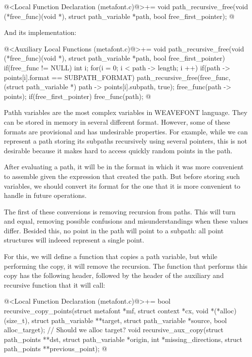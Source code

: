 \iniciocodigo
@<Local Function Declaration (metafont.c)@>+=
void path_recursive_free(void (*free_func)(void *),
                         struct path_variable *path,
                         bool free_first_pointer);
@
\fimcodigo

And its implementation:

\iniciocodigo
@<Auxiliary Local Functions (metafont.c)@>+=
void path_recursive_free(void (*free_func)(void *),
                         struct path_variable *path,
                         bool free_first_pointer){
  if(free_func != NULL){
    int i;
    for(i = 0; i < path -> length; i ++){
      if(path -> points[i].format == SUBPATH_FORMAT)
        path_recursive_free(free_func, (struct path_variable *)
                                       path -> points[i].subpath, true);
    }
    free_func(path -> points);
    if(free_first_pointer)
      free_func(path);
  }
}
@
\fimcodigo


Pathh variables are the most complex variables in WEAVEFONT
language. They can be stored in memory in several different
format. However, some of these formats are provisional and has
undesirable properties. For example, while we can represent a path
storing its subpaths recursively using several pointers, this is not
desirable because it makes hard to access quickly random points in the
path.

After evaluating a path, it will be in the format in which it was more
convenient to assemble given the expression that created the path. But
before storing such variables, we should convert its format for the
one that it is more convenient to handle in future operations.

The first of these conversions is removing recursion from paths. This
will turn  and  equal,
removing possible confusions and misunderstandings when these values
differ. Besided this, no point in the path will point to a subpath:
all point structures will indeeed represent a single point.

For this, we will define a function that copies a path variable, but
while performing the copy, it will remove the recursion. The function
that performs this copy has the following header, followed by the
header of the auxiliary and recursive function that it will call:

\iniciocodigo
@<Local Function Declaration (metafont.c)@>+=
bool recursive_copy_points(struct metafont *mf, struct context *cx,
                           void *(*alloc)(size_t),
                           struct path_variable **target,
                           struct path_variable *source,
                           bool alloc_target); // Should we alloc target?
void recursive_aux_copy(struct path_points **dst,
                        struct path_variable *origin, int *missing_directions,
                        struct path_points **previous_point);
@
\fimcodigo


